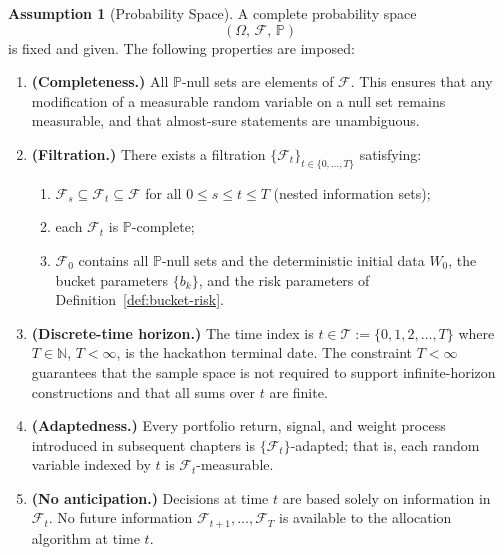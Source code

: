 \documentclass[12pt,openany]{book}
\newcommand{\calF}{\mathcal{F}}
\newcommand{\Prob}{\mathbb{P}}
\numberwithin{equation}{chapter}
\theoremstyle{plain}
\theoremstyle{definition}
\newtheorem{assumption}[theorem]{Assumption}
\theoremstyle{remark}
\numberwithin{equation}{chapter}
\theoremstyle{plain}
\begin{document}
\begin{assumption}[Probability Space]
\label{asm:prob-space-ch1}
A complete probability space
\begin{equation}
  (\Omega,\,\calF,\,\Prob)
  \label{eq:prob-space}
\end{equation}
is fixed and given.  The following properties are imposed:
\begin{enumerate}[label=\textbf{(PS\arabic*)}]
  \item \textbf{(Completeness.)}
        All $\Prob$-null sets are elements of $\calF$.  This ensures
        that any modification of a measurable random variable on a
        null set remains measurable, and that almost-sure statements
        are unambiguous.

  \item \textbf{(Filtration.)}
        There exists a filtration $\{\calF_t\}_{t \in \{0,\ldots,T\}}$
        satisfying:
        \begin{enumerate}[label=\textbf{(F\arabic*)}]
          \item $\calF_s \subseteq \calF_t \subseteq \calF$ for all
                $0 \leq s \leq t \leq T$ (nested information sets);
          \item each $\calF_t$ is $\Prob$-complete;
          \item $\calF_0$ contains all $\Prob$-null sets and the
                deterministic initial data $W_0$, the bucket
                parameters $\{b_k\}$, and the risk parameters of
                Definition~\ref{def:bucket-risk}.
        \end{enumerate}

  \item \textbf{(Discrete-time horizon.)}
        The time index is $t \in \mathcal{T} := \{0, 1, 2, \ldots, T\}$
        where $T \in \mathbb{N}$, $T < \infty$, is the
        hackathon terminal date.  The constraint $T < \infty$
        guarantees that the sample space is not required to support
        infinite-horizon constructions and that all sums over $t$ are
        finite.

  \item \textbf{(Adaptedness.)}
        Every portfolio return, signal, and weight process introduced
        in subsequent chapters is $\{\calF_t\}$-adapted; that is, each
        random variable indexed by $t$ is $\calF_t$-measurable.

  \item \textbf{(No anticipation.)}
        Decisions at time $t$ are based solely on information in
        $\calF_t$.  No future information $\calF_{t+1}, \ldots,
        \calF_T$ is available to the allocation algorithm at time $t$.
\end{enumerate}
\end{assumption}
\end{document}
